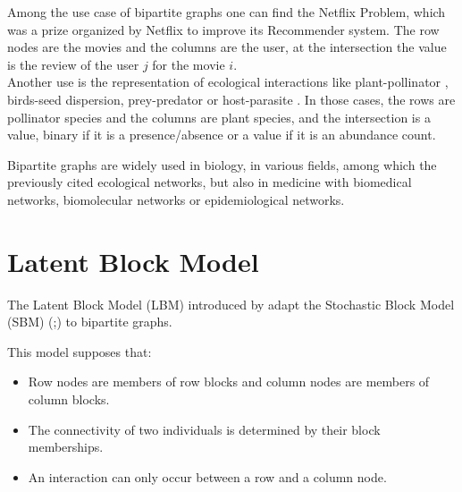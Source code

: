 \documentclass[12pt,a4paper]{report}
\begin{document}
Among the use case of bipartite graphs one can find the Netflix Problem, which
was a prize organized by Netflix to improve its Recommender system. The row 
nodes are the movies and the columns are the user, at the intersection the value
is the review of the user $j$ for the movie $i$.\\

Another use is the representation of ecological interactions like 
plant-pollinator \parencite{ramos-jilibertoTopologicalChangeAndean2010}, birds-seed
dispersion, prey-predator or
host-parasite \parencite{kaszewska-gilasGlobalStudiesHostParasite2021}.
In those cases, the rows are pollinator species and the columns are plant 
species, and the intersection is a value, binary if it is a presence/absence or
a value if it is an abundance count.

Bipartite graphs are widely used in biology, in various fields, among which the
previously cited ecological networks, but also in medicine with biomedical
networks, biomolecular networks or epidemiological 
networks. \parencite{pavlopoulosBipartiteGraphsSystems2018}

\section{Latent Block Model}

The Latent Block Model (LBM) introduced by \cite{govaertLatentBlockModel2010} 
adapt the Stochastic Block Model (SBM) 
(\cite{hollandStochasticBlockmodelsFirst1983};\cite{snijdersEstimationPredictionStochastic1997})
to bipartite graphs. 


This model supposes that:
\begin{itemize}
    \item Row nodes are members of row blocks and column nodes are members of 
    column blocks.
    \item The connectivity of two individuals is determined by their block 
    memberships.
    \item An interaction can only occur between a row and a column node.
\end{itemize}
\end{document}
